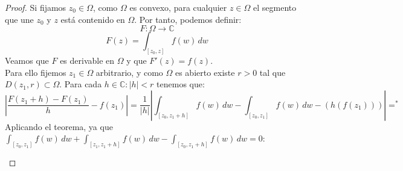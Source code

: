 \begin{proof}
    Si fijamos $z_0 \in \Omega$, como $\Omega$ es convexo, para cualquier $z \in \Omega$ el segmento que une $z_0$ y $z$ está contenido en $\Omega$. Por tanto, podemos definir:
    \[
    F : \Omega \to \mathbb{C}
    \]
    \[
        F(z) = \int_{[z_0, z]} f(w) \, dw
    \]
    Veamos que $F$ es derivable en $\Omega$ y que $F'(z) = f(z)$.\\
    Para ello fijemos $z_1 \in \Omega$ arbitrario, y como $\Omega$ es abierto existe $r > 0$ tal que $D(z_1, r) \subset \Omega$. Para cada $h \in \mathbb{C} : |h| < r$ tenemos que:
    \[
        \left| \frac{F(z_1 + h) - F(z_1)}{h} - f(z_1) \right| =
        \frac{1}{|h|} 
        \left|
        \int_{[z_0, z_1 + h]} f(w) \, dw - 
        \int_{[z_0, z_1]} f(w) \, dw -
        (h(f(z_1)))
        \right|
        =^*
    \]
    Aplicando el teorema, ya que $\int_{[z_0, z_1]} f(w) \, dw + \int_{[z_1, z_1 + h]} f(w) \, dw - \int_{[z_0, z_1 + h]} f(w) \, dw = 0$:
    \begin{center}
    \end{center}


\end{proof}
